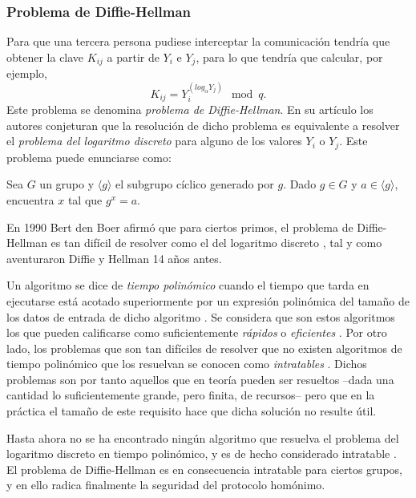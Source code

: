 \documentclass[
  a4paper,
  12pt,
  spanish,
]{scrartcl}
\begin{document}
\subsubsection{Problema de Diffie-Hellman}

Para que una tercera persona pudiese interceptar la comunicación tendría que obtener la clave \(K_{ij}\) a partir de \(Y_i\) e \(Y_j\), para lo que tendría que calcular, por ejemplo, \[K_{ij} = Y_i^{\left(log_{\alpha} Y_j\right)} \mod q.\] 
Este problema se denomina \textit{problema de Diffie-Hellman}. 
En su artículo los autores conjeturan que la resolución de dicho problema es equivalente a resolver el \textit{problema del logaritmo discreto} para alguno de los valores \(Y_i\) o \(Y_j\). Este problema puede enunciarse como: \begin{displayquote}
  Sea \(G\) un grupo y \(\langle g \rangle\) el subgrupo cíclico generado por \(g\). Dado \(g \in G\) y \(a \in \langle g \rangle\), encuentra \(x\) tal que \(g^x = a\).
\end{displayquote}
En 1990 Bert den Boer afirmó que para ciertos primos, el problema de Diffie-Hellman es tan difícil de resolver como el del logaritmo discreto \parencite{goos_diffie-hellman_1990}, tal y como aventuraron Diffie y Hellman 14 años antes.

Un algoritmo se dice de \textit{tiempo polinómico} cuando el tiempo que tarda en ejecutarse está acotado superiormente por un expresión polinómica del tamaño de los datos de entrada de dicho algoritmo \parencite[6]{garey_computers_1979}. Se considera que son estos algoritmos los que pueden calificarse como suficientemente \textit{rápidos} o \textit{eficientes} \parencite[33]{goldreich_computational_2008}.
Por otro lado, los problemas que son tan difíciles de resolver que no existen algoritmos de tiempo polinómico que los resuelvan se conocen como \textit{intratables} \parencite[8]{garey_computers_1979}. 
Dichos problemas son por tanto aquellos que en teoría pueden ser resueltos --dada una cantidad lo suficientemente grande, pero finita, de recursos-- pero que en la práctica el tamaño de este requisito hace que dicha solución no resulte útil.

Hasta ahora no se ha encontrado ningún algoritmo que resuelva el problema del logaritmo discreto en tiempo polinómico, y es de hecho considerado intratable \parencite{rueppel_how_1993}.
El problema de Diffie-Hellman es en consecuencia intratable para ciertos grupos, y en ello radica finalmente la seguridad del protocolo homónimo.
\end{document}
